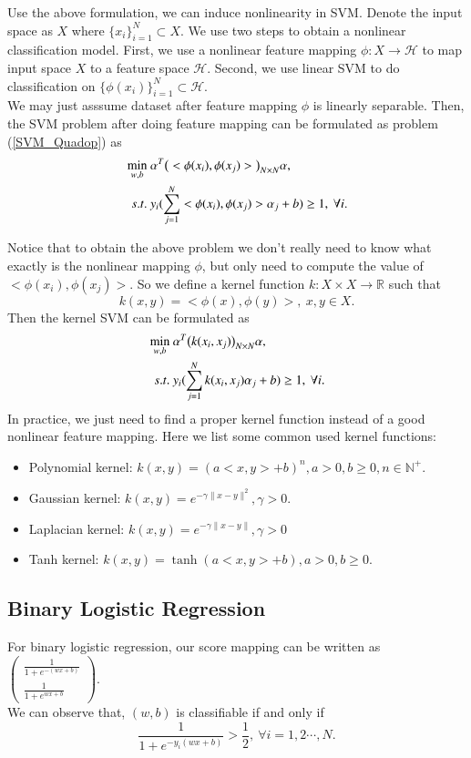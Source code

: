 Use the above formulation, we can induce nonlinearity in SVM. Denote the input space as $X$ where $\{x_i\}_{i=1}^N \subset X$. We use two steps to obtain a nonlinear classification model. First, we use a nonlinear feature mapping $\phi: X\rightarrow \mathcal{H}$ to map input space $X$ to a feature space $\mathcal{H}$. Second, we use linear SVM to do classification on $\{\phi(x_i)\}_{i=1}^N\subset \mathcal{H}$.\\

We may just asssume dataset after feature mapping $\phi$ is linearly separable. Then, the SVM problem after doing feature mapping can be formulated as
problem (\ref{SVM_Quadop}) as 
\begin{align}{\label{SVM_Quadop_innerprod}}
\min_{w,b}&\ \alpha^T \big(<\phi(x_i),\phi(x_j)>\big)_{N\times N} \alpha,\\
s.t.&\ y_i(\sum_{j = 1}^N <\phi(x_i),\phi(x_j)>\alpha_j+b) \geq 1,\ \forall i. 
\end{align}

Notice that to obtain the above problem we don't really need to know what exactly is the nonlinear mapping $\phi$, but only need to compute the value of $<\phi(x_i),\phi(x_j)>$. So we define a kernel function $k: X\times X\rightarrow \mathbb{R}$ such that 
\begin{equation}
	k(x,y) = <\phi(x),\phi(y)>,\ x,y\in X.
\end{equation}
Then the kernel SVM can be formulated as
\begin{align}{\label{SVM_Quadop_kernel}}
\min_{w,b}&\ \alpha^T \big(k(x_i,x_j)\big)_{N\times N} \alpha,\\
s.t.&\ y_i(\sum_{j = 1}^N k(x_i,x_j)\alpha_j+b) \geq 1,\ \forall i. 
\end{align}
In practice, we just need to find a proper kernel function instead of a good nonlinear feature mapping. Here we list some common used kernel functions:
\begin{itemize}
	\item Polynomial kernel: $k(x,y) = (a <x,y> + b)^n, a > 0, b\geq 0, n\in \mathbb{N}^+$.
	\item Gaussian kernel: $k(x,y) = e^{-\gamma\|x-y\|^2}, \gamma > 0$.
	\item Laplacian kernel: $k(x,y) = e^{-\gamma\|x-y\|}, \gamma > 0$
	\item Tanh kernel: $k(x,y) = \tanh(a<x,y>+b), a>0, b\geq 0.$
\end{itemize}

\subsection{Binary Logistic Regression}
For binary logistic regression, our score mapping can be written as
$\begin{pmatrix}
	\frac{1}{1+ e^{-(wx+b)}}\\
	\frac{1}{1+e^{wx+b}}
\end{pmatrix}$. \\
We can observe that, $(w,b)$ is classifiable if and only if
\begin{equation}
	\frac{1}{1+ e^{-y_i(wx+b)}} > \frac{1}{2},\ \forall i = 1,2\cdots,N.
\end{equation}

